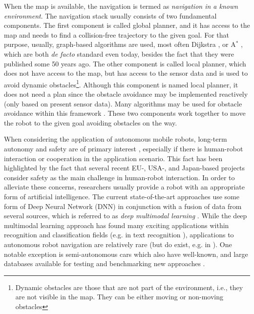 When the map is available, the navigation is termed as \emph{navigation in a known environment}. The navigation stack usually consists of two fundamental components. The first component is called global planner, and it has access to the map and needs to find a collision-free trajectory to the given goal. For that purpose, usually, graph-based algorithms are used, most often Dijkstra \cite{Dijkstra1959}, or A$^*$ \cite{Hart1968}, which are both \emph{de facto} standard even today, besides the fact that they were published some 50 years ago. The other component is called local planner, which does not have access to the map, but has access to the sensor data and is used to avoid dynamic obstacles\footnote{Dynamic obstacles are those that are not part of the environment, i.e., they are not visible in the map. They can be either moving or non-moving obstacles}. Although this component is named local planner, it does not need a plan since the obstacle avoidance may be implemented reactively (only based on present sensor data). Many algorithms may be used for obstacle avoidance within this framework \cite{Khatib1985,Minguez2005,Fox1999,Borenstein1991,Fiorini1998}. These two components work together to move the robot to the given goal avoiding obstacles on the way.

When considering the application of autonomous mobile robots, long-term autonomy and safety are of primary interest \cite{Kunze2018}, especially if there is human-robot interaction or cooperation in the application scenario. This fact has been highlighted by the fact that several recent EU-, USA-, and Japan-based projects consider safety as the main challenge in human-robot interaction\cite{Guiochet2017}. In order to alleviate these concerns, researchers usually provide a robot with an appropriate form of artificial intelligence. The current state-of-the-art approaches use some form of Deep Neural Network (DNN) \cite{Sze2017} in conjunction with a fusion of data from several sources, which is referred to as \emph{deep multimodal learning} \cite{Ramachandram2017}. While the deep multimodal learning approach has found many exciting applications within recognition and classification fields (e.g. in text recognition  \cite{Wang2017}), applications to autonomous robot navigation are relatively rare (but do exist, e.g. in \cite{Zhu2017,Giusti2016,Ran2017}). One notable exception is semi-autonomous cars \cite{Ramachandram2017,Chen2015,Jain2016} which also have well-known, and large databases available for testing and benchmarking new approaches \cite{Geiger2013,Maddern2016}. 

